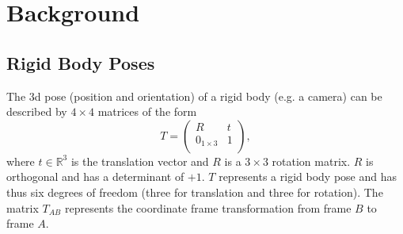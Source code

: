 \documentclass[conference]{IEEEtran}
\newcommand{\sco}[1]{\uppercase{\mathbf{#1}}}
\newcommand{\vcr}[1]{#1}
\begin{document}
\section{Background}

\subsection {Rigid Body Poses}
The 3d pose (position and orientation) of a rigid body (e.g. a camera) can be described by $4\times 4$ matrices of the form 
$$ 
T = 
\left(
\begin{array}{c|c}
	R & \vcr{t} \\ \hline
	0_{1\times 3} & 1 \\
\end{array}
\right),
$$
where $t\in \mathbb{R}^3$ is the translation vector and $R$ is a $3\times 3$ rotation matrix.
$R$ is orthogonal and has a determinant of $+1$.
$T$ represents a rigid body pose and has thus six degrees of freedom (three for translation and three for rotation).  
The matrix $T_{AB}$ represents the coordinate frame transformation from frame $B$ to frame $A$.
\end{document}
